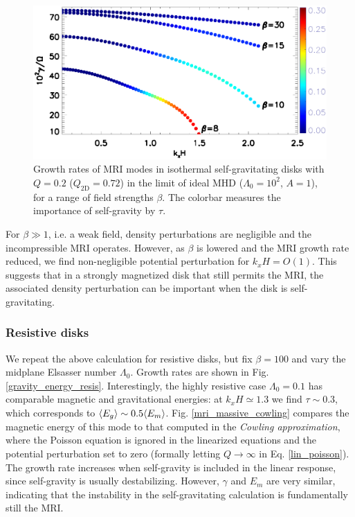 \begin{figure}
  \includegraphics[width=\linewidth]{figures/compare_energy_ideal}
  \caption{Growth rates of MRI modes in isothermal self-gravitating
    disks with $Q=0.2$ ($Q_\mathrm{2D}=0.72$) in the limit of ideal MHD
    ($\Lambda_0=10^2$, $A=1$), for a range of field strengths $\beta$. The
    colorbar measures the importance of self-gravity by $\tau$.  
    \label{gravity_energy}}
\end{figure}

For $\beta\gg 1$, i.e. a weak field, density perturbations are
negligible and the incompressible MRI operates. However, as $\beta$ is
lowered and the MRI growth rate reduced, we find non-negligible
potential perturbation for $k_xH=O(1)$. This suggests that in a
strongly magnetized disk that still permits the MRI, the associated
density perturbation can be important when the disk is
self-gravitating. %



\subsubsection{Resistive disks}
We repeat the above calculation for resistive disks, but fix
$\beta=100$ and vary the midplane Elsasser number $\Lambda_0$. Growth
rates are shown in Fig. \ref{gravity_energy_resis}. 
Interestingly, the highly resistive case $\Lambda_0=0.1$ has
comparable magnetic and gravitational energies: at $k_xH\simeq1.3$ we
find $\tau\sim 0.3$, which corresponds to $\langle{E_g}\rangle\sim 0.5\langle{E_m}\rangle$.  
Fig. \ref{mri_massive_cowling} compares the magnetic
energy of this mode to that computed in the \emph{Cowling  
  approximation}, where the Poisson equation is ignored in the 
linearized equations and the potential perturbation set to zero  
(formally letting $Q\to\infty$ in Eq. \ref{lin_poisson}).  
The growth rate increases when self-gravity is included in the linear
response, since self-gravity is usually destabilizing. However, 
$\gamma$ and $E_m$ are very similar, indicating that the instability
in the self-gravitating calculation is fundamentally still the MRI.   

